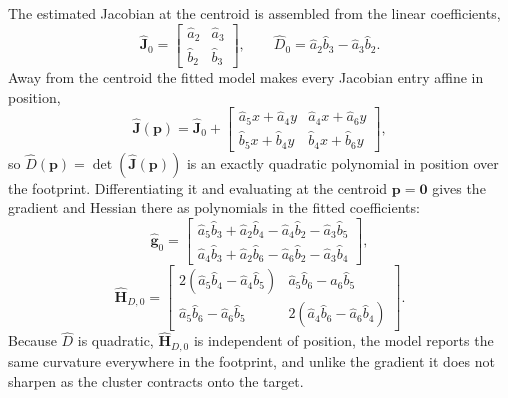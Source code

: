 \documentclass[lettersize,journal]{IEEEtran}
\begin{document}
The estimated Jacobian at the centroid is assembled from the linear
coefficients,
\begin{equation}
    \hat{\mathbf{J}}_0 =
    \begin{bmatrix}
        \hat{a}_2 & \hat{a}_3 \\ \hat{b}_2 & \hat{b}_3
    \end{bmatrix},
    \qquad
    \hat{D}_0 = \hat{a}_2 \hat{b}_3 - \hat{a}_3 \hat{b}_2.
    \label{eq:J_hat}
\end{equation}
Away from the centroid the fitted model makes every Jacobian entry affine
in position,
\begin{equation}
    \hat{\mathbf{J}}(\mathbf{p}) = \hat{\mathbf{J}}_0 +
    \begin{bmatrix}
        \hat{a}_5 x + \hat{a}_4 y &
        \hat{a}_4 x + \hat{a}_6 y \\
        \hat{b}_5 x + \hat{b}_4 y &
        \hat{b}_4 x + \hat{b}_6 y
    \end{bmatrix},
    \label{eq:jac_affine}
\end{equation}
so $\hat{D}(\mathbf{p}) = \det(\hat{\mathbf{J}}(\mathbf{p}))$ is an exactly
quadratic polynomial in position over the footprint. Differentiating
it and evaluating at the centroid $\mathbf{p} = \mathbf{0}$ gives the
gradient and Hessian there as polynomials in the fitted coefficients:
\begin{equation}
    \hat{\mathbf{g}}_0 =
    \begin{bmatrix}
        \hat{a}_5 \hat{b}_3 + \hat{a}_2 \hat{b}_4
            - \hat{a}_4 \hat{b}_2 - \hat{a}_3 \hat{b}_5 \\
        \hat{a}_4 \hat{b}_3 + \hat{a}_2 \hat{b}_6
            - \hat{a}_6 \hat{b}_2 - \hat{a}_3 \hat{b}_4
    \end{bmatrix},
    \label{eq:grad_det}
\end{equation}
\begin{equation}
    \hat{\mathbf{H}}_{D,0} =
    \begin{bmatrix}
        2(\hat{a}_5 \hat{b}_4 - \hat{a}_4 \hat{b}_5) &
        \hat{a}_5 \hat{b}_6 - \hat{a}_6 \hat{b}_5 \\
        \hat{a}_5 \hat{b}_6 - \hat{a}_6 \hat{b}_5 &
        2(\hat{a}_4 \hat{b}_6 - \hat{a}_6 \hat{b}_4)
    \end{bmatrix}.
    \label{eq:hess_det}
\end{equation}
Because $\hat{D}$ is quadratic, $\hat{\mathbf{H}}_{D,0}$ is independent of
position, the model reports the same curvature everywhere in the
footprint, and unlike the gradient it does not sharpen as the cluster
contracts onto the target.
\end{document}
